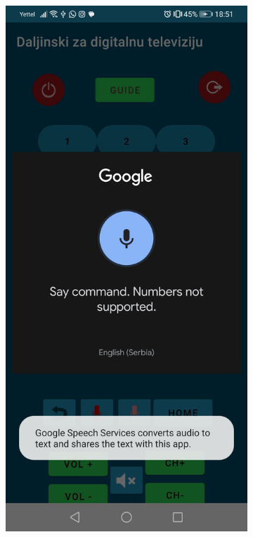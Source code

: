 \documentclass[implementacija.tex]{subfiles}
\begin{document}
\begin{figure}
    \centering
    \begin{subfigure}[b]{0.3\textwidth}
        \centering
        \includegraphics[width=\textwidth,keepaspectratio]{Implementacija/snimci_ekrana/10_obican_google_slusanje.jpg}

\end{subfigure}
\end{figure}
\end{document}
